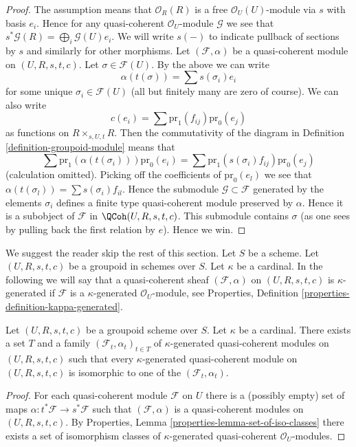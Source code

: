 \begin{proof}
The assumption means that $\mathcal{O}_R(R)$ is a free
$\mathcal{O}_U(U)$-module via $s$ with basis $e_i$. Hence
for any quasi-coherent $\mathcal{O}_U$-module $\mathcal{G}$
we see that $s^*\mathcal{G}(R) = \bigoplus_i \mathcal{G}(U)e_i$.
We will write $s(-)$ to indicate pullback of sections by $s$ and
similarly for other morphisms.
Let $(\mathcal{F}, \alpha)$ be a quasi-coherent module on
$(U, R, s, t, c)$. Let $\sigma \in \mathcal{F}(U)$. By the above
we can write
$$
\alpha(t(\sigma)) = \sum s(\sigma_i) e_i
$$
for some unique $\sigma_i \in \mathcal{F}(U)$ (all but finitely many
are zero of course). We can also write
$$
c(e_i) = \sum \text{pr}_1(f_{ij}) \text{pr}_0(e_j)
$$
as functions on $R \times_{s, U, t}R$. Then the commutativity of the diagram
in Definition \ref{definition-groupoid-module} means that
$$
\sum \text{pr}_1(\alpha(t(\sigma_i))) \text{pr}_0(e_i)
=
\sum \text{pr}_1(s(\sigma_i)f_{ij}) \text{pr}_0(e_j)
$$
(calculation omitted). Picking off the coefficients of $\text{pr}_0(e_l)$
we see that $\alpha(t(\sigma_l)) = \sum s(\sigma_i)f_{il}$. Hence
the submodule $\mathcal{G} \subset \mathcal{F}$ generated by the
elements $\sigma_i$ defines a finite type quasi-coherent module
preserved by $\alpha$. Hence it is a subobject of $\mathcal{F}$ in
$\QCoh(U, R, s, t, c)$. This submodule contains $\sigma$
(as one sees by pulling back the first relation by $e$). Hence we win.
\end{proof}

\noindent
We suggest the reader skip the rest of this section. Let $S$ be a scheme.
Let $(U, R, s, t, c)$ be a groupoid in schemes over $S$. Let $\kappa$ be a
cardinal. In the following we will say that a quasi-coherent sheaf
$(\mathcal{F}, \alpha)$ on $(U, R, s, t, c)$ is $\kappa$-generated if
$\mathcal{F}$ is a $\kappa$-generated $\mathcal{O}_U$-module, see
Properties, Definition \ref{properties-definition-kappa-generated}.

\begin{lemma}
\label{lemma-set-of-iso-classes}
Let $(U, R, s, t, c)$ be a groupoid scheme over $S$.
Let $\kappa$ be a cardinal.
There exists a set $T$ and a family $(\mathcal{F}_t, \alpha_t)_{t \in T}$ of
$\kappa$-generated quasi-coherent modules on $(U, R, s, t, c)$
such that every $\kappa$-generated quasi-coherent module on
$(U, R, s, t, c)$ is isomorphic to one of the $(\mathcal{F}_t, \alpha_t)$.
\end{lemma}

\begin{proof}
For each quasi-coherent module $\mathcal{F}$ on $U$ there is a
(possibly empty) set of maps $\alpha : t^*\mathcal{F} \to s^*\mathcal{F}$
such that $(\mathcal{F}, \alpha)$ is a quasi-coherent modules on
$(U, R, s, t, c)$. By
Properties, Lemma \ref{properties-lemma-set-of-iso-classes}
there exists a set of isomorphism classes of $\kappa$-generated
quasi-coherent $\mathcal{O}_U$-modules.
\end{proof}

